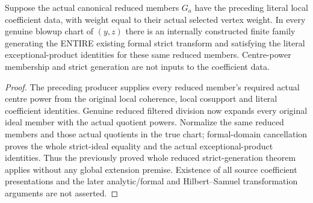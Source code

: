 \begin{theorem}
\label{hir:actual-local-coefficient-reduced-strict-generators}
\leanok
Suppose the actual canonical reduced members $G_a$ have the preceding
literal local coefficient data, with weight equal to their actual selected
vertex weight. In every genuine blowup chart of $(y,z)$ there is an
internally constructed finite family generating the ENTIRE existing formal
strict transform and satisfying the literal exceptional-product identities
for these same reduced members. Centre-power membership and strict
generation are not inputs to the coefficient data.
\end{theorem}
\begin{proof}
The preceding producer supplies every reduced member's required actual
centre power from the original local coherence, local cosupport and
literal coefficient identities. Genuine reduced filtered division now
expands every original ideal member with the actual quotient powers.
Normalize the same reduced members and those actual quotients in the true
chart; formal-domain cancellation proves the whole strict-ideal equality
and the actual exceptional-product identities. Thus the previously proved
whole reduced strict-generation theorem applies without any global
extension premise. Existence of all source coefficient presentations and
the later analytic/formal and Hilbert--Samuel transformation arguments
are not asserted.
\end{proof}
